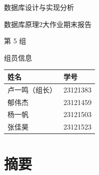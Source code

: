\documentclass[UTF8,zihao=-4,openany]{ctexrep}
\numberwithin{figure}{chapter}
\numberwithin{table}{chapter}
\begin{document}
\begin{titlepage}
    \thispagestyle{empty}
    \centering
    \vspace*{2.4cm}

    {\par}
    \vspace{0.35cm}
    {\heiti 数据库设计与实现分析\par}

    \vspace{1.0cm}

    {\heiti 数据库原理2大作业期末报告\par}

    \vspace{1.2cm}

    {\heiti 第 5 组\par}

    \vspace{1.8cm}

    {\heiti 组员信息\par}
    \vspace{0.4cm}
    \begin{table}[H]
        \centering
        \renewcommand{\arraystretch}{1.6}
        \begin{tabular}{l l}
            \toprule
            姓名 & 学号 \\
            \midrule
            卢一鸣（组长） & 23121383\\
            郁伟杰 & 23121459 \\
            杨一帆 & 23121503 \\
            张佳昊 & 23121523 \\
            \bottomrule
        \end{tabular}
    \end{table}

    \vfill

    \vspace{0.5cm}
\end{titlepage}

\chapter*{摘要}
\end{document}
